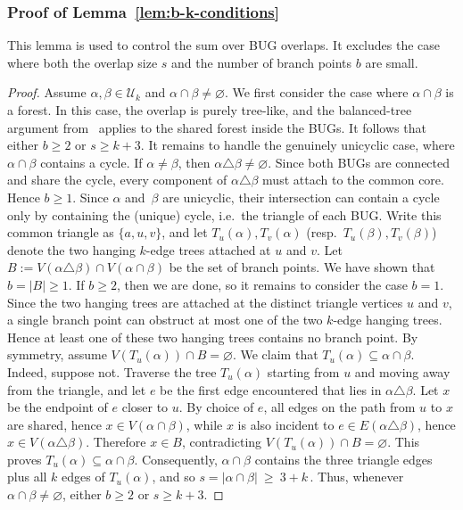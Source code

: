\documentclass[11pt, letterpaper]{article}
\numberwithin{equation}{section}
\newcommand{\cU}{\mathcal{U}}
\begin{document}
\subsubsection{Proof of Lemma~\ref{lem:b-k-conditions}}\label{app:pf:lem:b-k-conditions}
This lemma is used to control the sum over BUG overlaps. It excludes the
case where both the overlap size $s$ and the number of branch points $b$ are small.
\begin{proof}
Assume $\alpha,\beta\in\cU_k$ and $\alpha\cap\beta\neq \varnothing$. We first consider the case where $\alpha\cap\beta$ is a forest. In this case, the overlap is purely tree-like, and the balanced-tree argument from~\cite[Proof of Theorem~2.2(b)]{sohn2025sharp} applies to the shared forest inside the BUGs. It follows that either $b\ge 2$ or $s\ge k+3$. It remains to handle the genuinely unicyclic case, where $\alpha\cap\beta$ contains a cycle.  If $\alpha\neq\beta$, then $\alpha\triangle\beta\neq\varnothing$. Since both BUGs
are connected and share the cycle, every component of $\alpha\triangle\beta$
must attach to the common core. Hence $b\ge1$. Since $\alpha$ and~$\beta$ are unicyclic, their
intersection can contain a cycle only by containing the (unique) cycle, i.e.\ the triangle of each BUG.
Write this common triangle as $\{a,u,v\}$, and let
$T_u(\alpha),T_v(\alpha)$ (resp.\ $T_u(\beta),T_v(\beta)$)
denote the two hanging $k$-edge trees attached at $u$ and $v$. Let $
B:=V(\alpha\triangle\beta)\cap V(\alpha\cap\beta)$
be the set of branch points. We have shown that $b=|B|\ge1$. If $b\ge2$, then we are done, so it remains to consider the case $b=1$. Since the two hanging trees are attached at the distinct triangle vertices $u$ and $v$, a single branch point can obstruct at most one of the two $k$-edge
hanging trees. Hence at least one of these two hanging trees contains no branch point. By symmetry, assume $V(T_u(\alpha))\cap B=\varnothing$. We claim that $T_u(\alpha)\subseteq \alpha\cap\beta$.
Indeed, suppose not. Traverse the tree $T_u(\alpha)$ starting from $u$ and moving away from the triangle,
and let $e$ be the first edge encountered that lies in $\alpha\triangle\beta$. Let $x$ be the endpoint of
$e$ closer to $u$. By choice of $e$, all edges on the path from $u$ to $x$ are shared, hence $x\in V(\alpha\cap\beta)$,
while $x$ is also incident to $e\in E(\alpha\triangle\beta)$, hence $x\in V(\alpha\triangle\beta)$. Therefore
$x\in B$, contradicting $V(T_u(\alpha))\cap B=\varnothing$. This proves $T_u(\alpha)\subseteq \alpha\cap\beta$. Consequently, $\alpha\cap\beta$ contains the three triangle edges plus all $k$ edges of $T_u(\alpha)$, and so
$
s = |\alpha\cap\beta|\ \ge\ 3+k \,.
$
Thus, whenever $\alpha\cap\beta\neq \varnothing$, either $b\ge 2$ or $s\ge k+3$.
   \end{proof}
\end{document}
